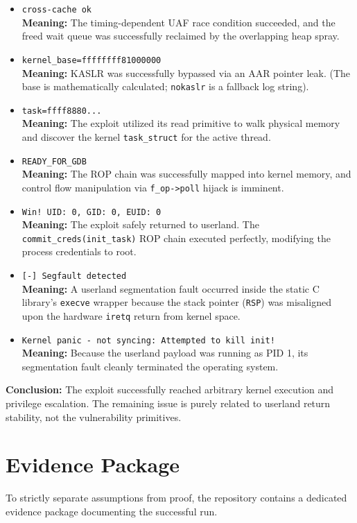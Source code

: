\documentclass[11pt,a4paper]{article}
\begin{document}
\begin{itemize}
    \item \texttt{cross-cache ok} \\ \textbf{Meaning:} The timing-dependent UAF race condition succeeded, and the freed wait queue was successfully reclaimed by the overlapping heap spray.
    \item \texttt{kernel\_base=ffffffff81000000} \\ \textbf{Meaning:} KASLR was successfully bypassed via an AAR pointer leak. (The base is mathematically calculated; \texttt{nokaslr} is a fallback log string).
    \item \texttt{task=ffff8880...} \\ \textbf{Meaning:} The exploit utilized its read primitive to walk physical memory and discover the kernel \texttt{task\_struct} for the active thread.
    \item \texttt{READY\_FOR\_GDB} \\ \textbf{Meaning:} The ROP chain was successfully mapped into kernel memory, and control flow manipulation via \texttt{f\_op->poll} hijack is imminent.
    \item \texttt{Win! UID: 0, GID: 0, EUID: 0} \\ \textbf{Meaning:} The exploit safely returned to userland. The \texttt{commit\_creds(init\_task)} ROP chain executed perfectly, modifying the process credentials to root.
    \item \texttt{[-] Segfault detected} \\ \textbf{Meaning:} A userland segmentation fault occurred inside the static C library's \texttt{execve} wrapper because the stack pointer (\texttt{RSP}) was misaligned upon the hardware \texttt{iretq} return from kernel space.
    \item \texttt{Kernel panic - not syncing: Attempted to kill init!} \\ \textbf{Meaning:} Because the userland payload was running as PID 1, its segmentation fault cleanly terminated the operating system.
\end{itemize}

\textbf{Conclusion:} The exploit successfully reached arbitrary kernel execution and privilege escalation. The remaining issue is purely related to userland return stability, not the vulnerability primitives.

\clearpage

\section{Evidence Package}
To strictly separate assumptions from proof, the repository contains a dedicated evidence package documenting the successful run.
\end{document}

